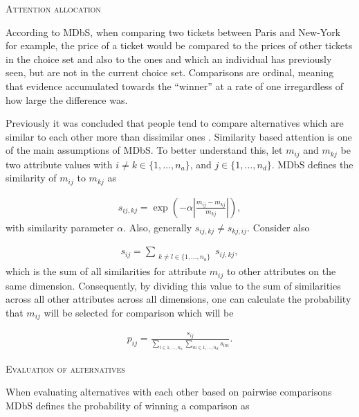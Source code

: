 \documentclass[a4paper,12pt]{article}
\begin{document}
\textsc{Attention allocation}

According to MDbS, when comparing two tickets between Paris and New-York for example, the price of a ticket would be compared to the prices of other tickets in the choice set and also to the ones and which an individual has previously seen, but are not in the current choice set. Comparisons are ordinal, meaning that evidence accumulated towards the ``winner'' at a rate of one irregardless of how large the difference was. 

Previously it was concluded that people tend to compare alternatives which are similar to each other more than dissimilar ones \citep{noguchi2014attraction}. Similarity based attention is one of the main assumptions of MDbS. To better understand this, let $m_{ij}$ and $m_{kj}$ be two attribute values with $i \neq k \in \{1, \ldots, n_a\}$, and $j \in \{1, \ldots, n_d\}$. MDbS defines the similarity of $m_{ij}$ to $m_{kj}$ as

\begin{align}\label{similarityMDBS}
s_{ij,kj} = \exp \left( - \alpha \left| \frac{m_{ij} - m_{kj}}{m_{kj}} \right| \right) ,
\end{align}
with similarity parameter $\alpha$. Also, generally $s_{ij,kj} \neq s_{kj,ij}.$ Consider also 

\begin{align}\label{sumOfSimilaritiesMDbS}
    s_{ij} = \sum_{\substack{k \neq l \in \{1, \ldots, n_a\}}} s_{ij,kj}  ,
\end{align}
which is the sum of all similarities for attribute $m_{ij}$ to other attributes on the same dimension. Consequently, by dividing this value to the sum of similarities across all other attributes across all dimensions, one can calculate the probability that $m_{ij}$ will be selected for comparison which will be 

\begin{align}\label{probabilityOfComparison}
    p_{ij} = \frac{s_{ij}}{\sum_{l \in {1, \ldots, n_a}} \sum_{m \in {1, \ldots, n_d}} s_{lm}} .
\end{align}

\textsc{Evaluation of alternatives}

When evaluating alternatives with each other based on pairwise comparisons MDbS defines the probability of winning a comparison as 
\end{document}
